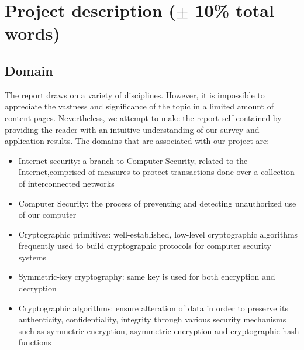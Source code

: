 \section{Project description ($\pm$ 10\% total words) }
\subsection{Domain}
The report draws on a variety of disciplines. However, it is impossible to appreciate the vastness and significance of the topic in a limited amount of content pages. Nevertheless, we attempt to make the report self-contained by providing the reader with an intuitive understanding of our survey and application results.
The domains that are associated with our project are: 
\begin{itemize}
\item Internet security: a branch to Computer Security, related to the Internet,comprised of measures to protect transactions done over a collection of interconnected networks
\end {itemize}
\begin{itemize} 
\item Computer Security: the process of preventing and detecting unauthorized use of our computer 
\end{itemize}
\begin{itemize}
\item Cryptographic primitives:  well-established, low-level cryptographic algorithms frequently used to build cryptographic protocols for computer security systems
\end{itemize}
\begin{itemize}
\item Symmetric-key cryptography: same key is used for both encryption and decryption
\end{itemize}
\begin{itemize}
\item Cryptographic algorithms: ensure alteration of data in order to preserve its authenticity, confidentiality, integrity through various security mechanisms such as symmetric encryption,  asymmetric encryption and cryptographic hash functions
\end{itemize}





